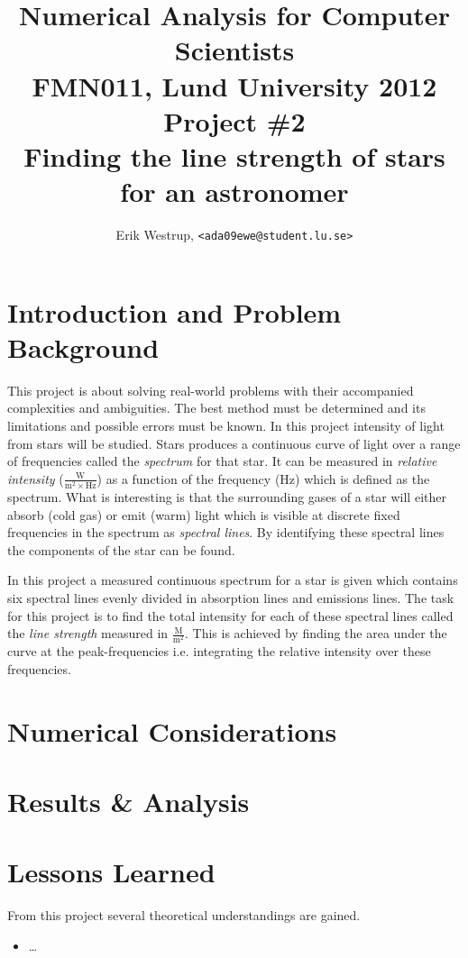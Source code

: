 \documentclass[10pt, a4paper]{article}
\title{Numerical Analysis for Computer Scientists\\ FMN011, Lund University 2012\\ Project \#2\\ Finding the line strength of stars for an astronomer}
\date{}
\author{Erik Westrup, \texttt{<ada09ewe@student.lu.se>}}
\begin{document}
\begin{titlepage}
\maketitle

\thispagestyle{empty}
\end{titlepage}
\setcounter{page}{2}

\section{Introduction and Problem Background}
This project is about solving real-world problems with their accompanied complexities and ambiguities. The best method must be determined and its limitations and possible errors must be known. In this project intensity of light from stars will be studied. Stars produces a continuous curve of light over a range of frequencies called the \emph{spectrum} for that star. It can be measured in \emph{relative intensity} ($\frac{\mathrm{W}}{\mathrm{m}^2\times\mathrm{Hz}}$) as a function of the frequency (Hz) which is defined as the spectrum. What is interesting is that the surrounding gases of a star will either absorb (cold gas) or emit (warm) light which is visible at discrete fixed frequencies in the spectrum as \emph{spectral lines}. By identifying these spectral lines the components of the star can be found.

In this project a measured continuous spectrum for a star is given which contains six spectral lines evenly divided in absorption lines and emissions lines. The task for this project is to find the total intensity for each of these spectral lines called the \emph{line strength} measured in $\frac{\mathrm{M}}{\mathrm{m}^2}$. This is achieved by finding the area under the curve at the peak-frequencies i.e. integrating the relative intensity over these frequencies.

\section{Numerical Considerations}

\section{Results \& Analysis}

\section{Lessons Learned}
From this project several theoretical understandings are gained.
\begin{itemize}
	\item \ldots
\end{itemize}
\end{document}
